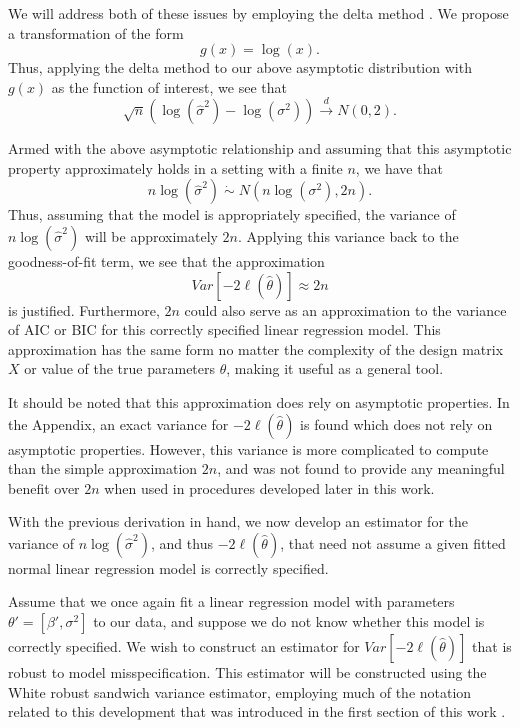 \documentclass[submit]{smj}
\begin{document}
		We will address both of these issues by employing the delta method \citet{Rao}. We propose a transformation of the form
		\begin{equation*}
			g(x) = \log(x) .
		\end{equation*}
		Thus, applying the delta method to our above asymptotic distribution with $g(x)$ as the function of interest, we see that
		\begin{equation*}
			\sqrt{n} ( \log (\hat{\sigma}^2) - \log(\sigma^2)) \xrightarrow[]{d} N(0, 2) .
		\end{equation*}

		Armed with the above asymptotic relationship and assuming that this asymptotic property approximately holds in a setting with a finite $n$, we have that
		\begin{equation*}
			n\log(\hat{\sigma}^2) \; \dot\sim \; N \left( n\log(\sigma^2), 2n \right) .
		\end{equation*}
		Thus, assuming that the model is appropriately specified, the variance of $n\log(\hat{\sigma}^2)$ will be approximately $2n$. Applying this variance back to the goodness-of-fit term,
		we see that the approximation
		\begin{equation*}
			Var \left[ -2 \ell (\hat{\theta}  ) \right] \approx 2n
		\end{equation*}
		is justified. Furthermore, $2n$ could also serve as an approximation to the variance of AIC or BIC for this correctly specified linear regression model. This approximation
		has the same form no matter the complexity of the design matrix $X$ or value of the true parameters $\theta$, making it useful as a
		general tool.

		It should be noted that this approximation does rely on asymptotic properties. In the Appendix, an exact variance for $-2 \ell (\hat{\theta})$ is found which does
		not rely on asymptotic properties. However, this variance is more complicated to compute than the simple approximation $2n$, and was not found to provide any meaningful
		benefit over $2n$ when used in procedures developed later in this work.

		With the previous derivation in hand, we now develop an estimator for the variance of $n\log(\hat{\sigma}^2)$, and thus $-2 \ell (\hat{\theta})$,
		that need not assume a given fitted normal linear regression model is correctly specified.

		Assume that we once again fit a linear regression model with parameters $\theta' = [\beta', \sigma^2]$ to our data, and suppose we do not know whether this model is correctly specified.
		We wish to construct an estimator for $Var \left[ -2 \ell (\hat{\theta}  ) \right]$ that is robust to model misspecification. This estimator will be constructed using the White robust
		sandwich variance estimator, employing much of the notation related to this development that was introduced in the first section of this work \citet{White1980}.
\end{document}

